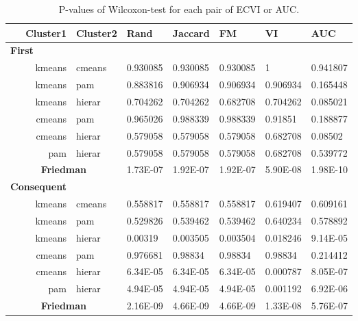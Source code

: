 \begin{table}[h]
	\small
	\centering
	\caption{P-values of Wilcoxon-test for each pair of ECVI or AUC.}
	\label{tab:ECVI_Pvalue_Test}
	\begin{tabular}{rllllll} \toprule
		Cluster1  & Cluster2   & Rand        & Jaccard     & FM          & VI          & AUC        \\ \midrule
		\multicolumn{1}{l}{\textbf{First}}       \\		
		kmeans       & cmeans        & 0.930085   & 0.930085   & 0.930085   & 1           & 0.941807   \\
		kmeans       & pam           & 0.883816   & 0.906934   & 0.906934   & 0.906934    & 0.165448  \\
		kmeans       & hierar  		 & 0.704262   & 0.704262   & 0.682708   & 0.704262    & 0.085021 \\
		cmeans       & pam           & 0.965026   & 0.988339   & 0.988339   & 0.91851     & 0.188877  \\
		cmeans       & hierar  		 & 0.579058   & 0.579058   & 0.579058   & 0.682708    & 0.08502 \\
		pam          & hierar  		 & 0.579058   & 0.579058   & 0.579058   & 0.682708    & 0.539772  \\
		\multicolumn{2}{c}{\textbf{Friedman}} & 1.73E-07       & 1.92E-07    & 1.92E-07   & 5.90E-08    & 1.98E-10   \\
		\multicolumn{1}{l}{\textbf{Consequent}}\\		
		kmeans       & cmeans        & 0.558817   & 0.558817   & 0.558817   & 0.619407   & 0.609161  \\
		kmeans       & pam           & 0.529826   & 0.539462   & 0.539462   & 0.640234   & 0.578892   \\
		kmeans       & hierar  		 & 0.00319    & 0.003505   & 0.003504   & 0.018246   & 9.14E-05   \\
		cmeans       & pam           & 0.976681   & 0.98834    & 0.98834    & 0.98834    & 0.214412  \\
		cmeans       & hierar 		 & 6.34E-05   & 6.34E-05    & 6.34E-05  & 0.000787   & 8.05E-07   \\
		pam          & hierar 		 & 4.94E-05   & 4.94E-05    & 4.94E-05  & 0.001192   & 6.92E-06   \\
		\multicolumn{2}{c}{\textbf{Friedman}} & 2.16E-09    & 4.66E-09    & 4.66E-09     & 1.33E-08    & 5.76E-07   \\
		\bottomrule
	\end{tabular}
\end{table}